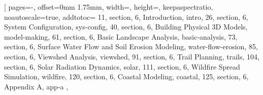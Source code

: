 \documentclass[11pt,          %
               phd,           %
               onehalfspacing %
               ]{ncsuthesis}
\begin{document}

%
[
pages={-},
offset={0mm 1.75mm},
width=\textwidth,
height=\textheight,
keepaspectratio,
noautoscale={true},
addtotoc={
	11, section, 6, Introduction, intro,
	26, section, 6, System Configuration, sys-config,
	40, section, 6, Building Physical 3D Models, model-making,
	61, section, 6, Basic Landscape Analysis, basic-analysis,
	73, section, 6, Surface Water Flow and Soil Erosion Modeling, water-flow-erosion,
	85, section, 6, Viewshed Analysis, viewshed,
	91, section, 6, Trail Planning, trails,
	104, section, 6, Solar Radiation Dynamics, solar,
	111, section, 6, Wildfire Spread Simulation, wildfire,
	120, section, 6, Coastal Modeling, coastal,
	125, section, 6, Appendix A, app-a
	},
\end{document}
